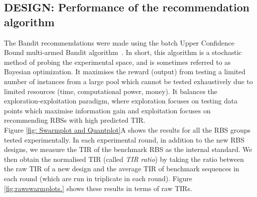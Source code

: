 \documentclass{scrartcl}[2013/05/29]%
\begin{document}
\subsection{DESIGN: Performance of the recommendation algorithm}
\label{sec:ucb-results}


The Bandit recommendations were made using the batch Upper Confidence Bound multi-armed Bandit algorithm~\cite{desautels2014parallelizing}.
In short, this algorithm is a stochastic method of probing the experimental space, and is sometimes referred to as Bayesian optimization.
It maximises the reward (output) from testing a limited number of instances from a large pool which cannot be tested exhaustively due to limited resources (time, computational power, money).
It balances the exploration-exploitation paradigm, where exploration focuses on testing data points which maximise information gain and exploitation focuses on recommending RBSs with high predicted TIR.\\

Figure \ref{fig: Swarmplot and Quantplot}A shows the results for all the RBS groups tested experimentally.
In each experimental round, in addition to the new RBS designs, we measure the TIR of the benchmark RBS as the internal standard.
We then obtain the normalised TIR (called \textit{TIR ratio}) by taking the ratio between the raw TIR of a new design and the average TIR of benchmark sequences in each round (which are run in triplicate in each round).
Figure \ref{fig:rawswarmplots.} shows these results in terms of raw TIRs.\\
\end{document}
